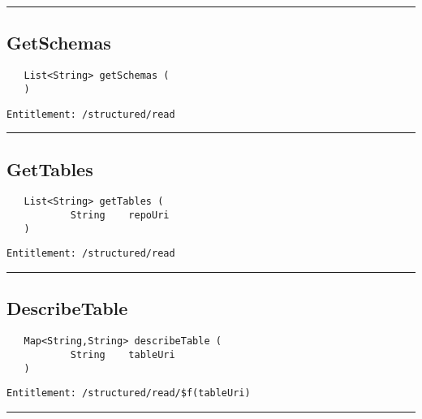 \rule{12cm}{2pt}
\subsection{GetSchemas}
\label{Api:GetSchemas}
\begin{verbatim}
   List<String> getSchemas (
   )
\end{verbatim}
\begin{Verbatim}[fontsize=\small, formatcom=\color{Maroon}]
  Entitlement: /structured/read
\end{Verbatim}



\rule{12cm}{2pt}
\subsection{GetTables}
\label{Api:GetTables}
\begin{verbatim}
   List<String> getTables (
           String    repoUri
   )
\end{verbatim}
\begin{Verbatim}[fontsize=\small, formatcom=\color{Maroon}]
  Entitlement: /structured/read
\end{Verbatim}



\rule{12cm}{2pt}
\subsection{DescribeTable}
\label{Api:DescribeTable}
\begin{verbatim}
   Map<String,String> describeTable (
           String    tableUri
   )
\end{verbatim}
\begin{Verbatim}[fontsize=\small, formatcom=\color{Maroon}]
  Entitlement: /structured/read/$f(tableUri)
\end{Verbatim}



\rule{12cm}{2pt}
